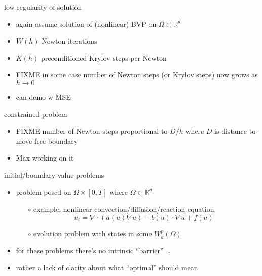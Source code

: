 \documentclass[hide notes,intlimits,usenames,dvipsnames]{beamer}
\newcommand{\RR}{\mathbb{R}}
\newcommand{\Div}{\nabla\cdot}
\newcommand{\grad}{\nabla}
\begin{document}
\begin{frame}{low regularity of solution}
\begin{itemize}
\item again assume solution of (nonlinear) BVP on $\Omega \subset \RR^d$
\item $W(h)$ Newton iterations
\item $K(h)$ preconditioned Krylov steps per Newton
\item FIXME  in some case number of Newton steps (or Krylov steps) now grows as $h\to 0$
\item can demo w MSE
\end{itemize}
\end{frame}


\begin{frame}{constrained problem}
\begin{itemize}
\item FIXME  number of Newton steps proportional to $D/h$ where $D$ is distance-to-move free boundary
\item Max working on it
\end{itemize}
\end{frame}


\begin{frame}{initial/boundary value problems}

\begin{itemize}
\item problem posed on $\Omega \times [0,T]$ where $\Omega \subset \RR^d$
    \begin{itemize}
    \item[$\circ$] example: nonlinear convection/diffusion/reaction equation
      $$u_t = \Div(a(u) \grad u) - b(u)\cdot \grad u + f(u)$$
    \item[$\circ$] evolution problem with states in some $W_k^p(\Omega)$
    \end{itemize}
\item for these problems there's no intrinsic ``barrier'' \dots
\item rather a lack of clarity about what ``optimal'' should mean
\end{itemize}
\end{frame}
\end{document}

